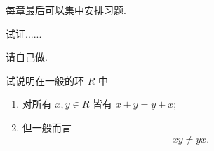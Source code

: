 	每章最后可以集中安排习题.
	\begin{Exercises}
		\item 试证......
		\begin{hint}
			请自己做.
		\end{hint}
		\item 试说明在一般的环 $R$ 中
		\begin{enumerate}
			\item 对所有 $x, y \in R$ 皆有 $x + y = y + x$;
			\item 但一般而言
			\[ xy \neq yx. \]
		\end{enumerate}
	\end{Exercises}